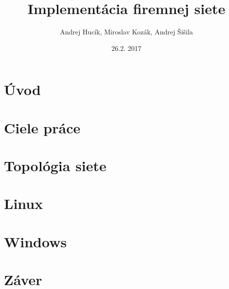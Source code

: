 \documentclass[12pt,twoside]{report}
\title{Implementácia firemnej siete}
\author{Andrej Hucík, Miroslav Kozák, Andrej Šišila}
\date{26.2. 2017}
\begin{document}


%

\tableofcontents

\listoffigures


\chapter{Úvod}


\chapter{Ciele práce}


\chapter{Topológia siete}


\chapter{Linux}


\chapter{Windows}


\chapter{Záver}


\printbibliography
\end{document}
